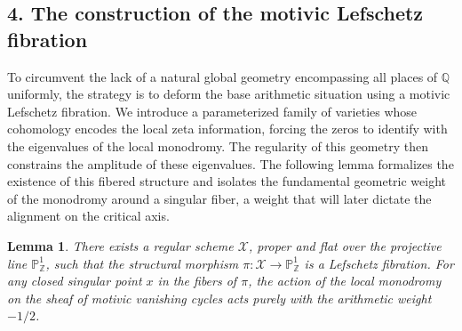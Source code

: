 \documentclass[
]{article}
\newtheorem{lemma}{Lemma}
\begin{document}
\hypertarget{the-construction-of-the-motivic-lefschetz-fibration}{%
\subsection{4. The construction of the motivic Lefschetz fibration}\label{the-construction-of-the-motivic-lefschetz-fibration}}

To circumvent the lack of a natural global geometry encompassing all places of $\mathbb{Q}$ uniformly, the strategy is to deform the base arithmetic situation using a motivic Lefschetz fibration. We introduce a parameterized family of varieties whose cohomology encodes the local zeta information, forcing the zeros to identify with the eigenvalues of the local monodromy. The regularity of this geometry then constrains the amplitude of these eigenvalues. The following lemma formalizes the existence of this fibered structure and isolates the fundamental geometric weight of the monodromy around a singular fiber, a weight that will later dictate the alignment on the critical axis.

\begin{lemma}
There exists a regular scheme $\mathcal{X}$, proper and flat over the projective line $\mathbb{P}^1_{\mathbb{Z}}$, such that the structural morphism $\pi : \mathcal{X} \to \mathbb{P}^1_{\mathbb{Z}}$ is a Lefschetz fibration. For any closed singular point $x$ in the fibers of $\pi$, the action of the local monodromy on the sheaf of motivic vanishing cycles acts purely with the arithmetic weight $-1/2$.
\end{lemma}
\end{document}
